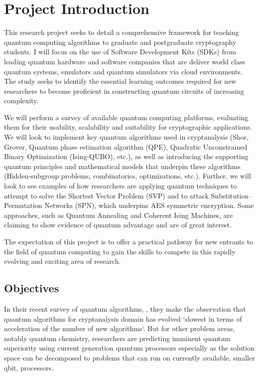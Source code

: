 \documentclass[11pt,a4paper]{article}
\begin{document}
\section{Project Introduction}

This research project seeks to detail a comprehensive framework for teaching quantum computing algorithms to
graduate and postgraduate cryptography students.
I will focus on the use of Software Development Kits (SDKs) from leading quantum hardware and software companies
that are deliver world class quantum systems, emulators and quantum simulators via cloud environments.
The study seeks to identify the essential learning outcomes required for new researchers to become proficient
in constructing quantum circuits of increasing complexity.

We will perform a survey of available quantum computing platforms, evaluating them for their usability, scalability
and suitability for cryptographic applications.  We will look to implement key quantum algorithms used in
cryptanalysis (Shor, Grover, Quantum phase estimation algorithm (QPE), Quadratic Unconstrained Binary Optimization 
(Ising-QUBO), etc.), as well as introducing the supporting quantum principles and
mathematical models that underpin these algorithms (Hidden-subgroup problems, combinatorics, optimizations, etc.). 
Further, we will look to see examples of how researchers are applying quantum techniques to attempt to solve the 
Shortest Vector Problem (SVP) and to attack Substitution–Permutation Networks (SPN), which underpins AES symmetric 
encryption.
Some approaches, such as Quantum Annealing and Coherent Ising Machines, are claiming to show evidence of quantum 
advantage and are of great interest.

The expectation of this project is to offer a practical pathway for new entrants to the field of quantum computing
to gain the skills to compete in this rapidly evolving and exciting area of research.

\subsection{Objectives}

In their recent survey of quantum algorithms, , \citeauthor{Arnault:2024} \cite{Arnault:2024} 
they make the observation
that quantum algorithms for cryptanalysis domain has evolved `slowest in terms of acceleration of the number of new 
algorithms`.  But for other problem areas, notably quantum chemistry, researchers are predicting imminent quantum superiority 
using current generation quantum processors \cite{Qunova:2024} especially as the solution space can be decomposed to problems 
that can run on currently available, smaller qbit, processors.
\end{document}
